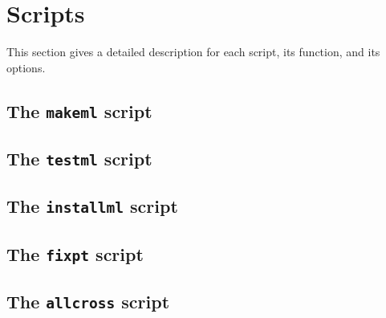 
\section{Scripts}

This section gives a detailed description for each script, its
function, and its options.

\subsection{The {\tt makeml} script}

\subsection{The {\tt testml} script}

\subsection{The {\tt installml} script}

\subsection{The {\tt fixpt} script}

\subsection{The {\tt allcross} script}
